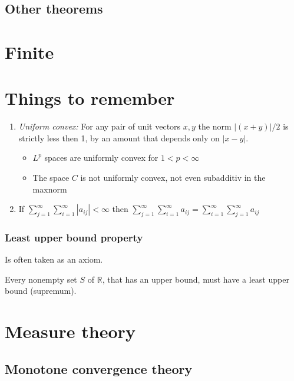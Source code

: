 \documentclass[titlepage]{article}
\begin{document}
\subsection{Other theorems}
\subsubsection{}





\section{Finite}


\section{Things to remember}
\begin{enumerate}
\item \textit{Uniform convex:} For any pair of unit vectors $x,y$ the norm $|(x+y)|/2$ is strictly less then 1, by an amount that depends only on $|x-y|$.
   \begin{itemize}
        \item $L^p$ spaces are uniformly convex for $1<p<\infty$
        \item The space $C$ is not uniformly convex, not even subadditiv in the maxnorm
    \end{itemize}
    \item If $\sum_{j = 1}^\infty \sum_{i = 1}^\infty |a_{ij}| < \infty $ then  $\sum_{j = 1}^\infty \sum_{i = 1}^\infty a_{ij}  = \sum_{i = 1}^\infty \sum_{j = 1}^\infty a_{ij}$ 
\end{enumerate}





\subsubsection{Least upper bound property}
Is often taken as an axiom.

Every nonempty set $S$ of $\mathbb{R}$, that has an upper bound, must have a least upper bound (supremum).
\section{Measure theory}
\subsection*{Monotone convergence theory}
\end{document}
